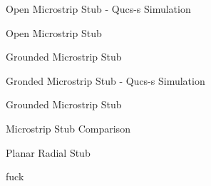 \begin{frame}{Open Microstrip Stub - Qucs-s Simulation}
\end{frame}

\begin{frame}{Open Microstrip Stub}
    \begin{twocolumns}[0.3]
        \leftcol
            \vspace{-30pt}
        \rightcol
            \vspace{-40pt}
    \end{twocolumns}
\end{frame}

\begin{frame}{Grounded Microstrip Stub}
\end{frame}

\begin{frame}{Gronded Microstrip Stub - Qucs-s Simulation}
\end{frame}

\begin{frame}{Grounded Microstrip Stub}
    \begin{twocolumns}[0.3]
        \leftcol
            \vspace{-30pt}
        \rightcol
            \vspace{-40pt}
    \end{twocolumns}
\end{frame}

\begin{frame}{Microstrip Stub Comparison}
    \vspace{-30pt}
\end{frame}

\begin{frame}{Planar Radial Stub}
    \begin{twocolumns}[0.5]
        \leftcol
            \vspace{-30pt}
        \rightcol
            fuck
    \end{twocolumns}
\end{frame}

